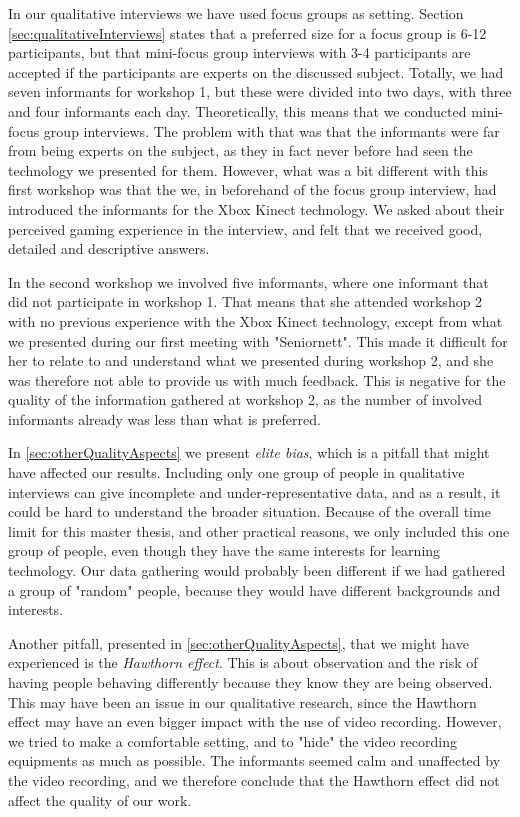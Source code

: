 In our qualitative interviews we have used focus groups as setting. Section \ref{sec:qualitativeInterviews} states that a preferred size for a focus group is 6-12 participants, but that mini-focus group interviews with 3-4 participants are accepted if the participants are experts on the discussed subject. Totally, we had seven informants for workshop 1, but these were divided into two days, with three and four informants each day. Theoretically, this means that we conducted mini-focus group interviews. The problem with that was that the informants were far from being experts on the subject, as they in fact never before had seen the technology we presented for them. However, what was a bit different with this first workshop was that the we, in beforehand of the focus group interview, had introduced the informants for the Xbox Kinect technology. We asked about their perceived gaming experience in the interview, and felt that we received good, detailed and descriptive answers. 

In the second workshop we involved five informants, where one informant that did not participate in workshop 1. That means that she attended workshop 2 with no previous experience with the Xbox Kinect technology, except from what we presented during our first meeting with "Seniornett". This made it difficult for her to relate to and understand what we presented during workshop 2, and she was therefore not able to provide us with much feedback. This is negative for the quality of the information gathered at workshop 2, as the number of involved informants already was less than what is preferred. 

In \ref{sec:otherQualityAspects} we present \emph{elite bias}, which is a pitfall that might have affected our results. Including only one group of people in qualitative interviews can give incomplete and under-representative data, and as a result, it could be hard to understand the broader situation. Because of the overall time limit for this master thesis, and other practical reasons, we only included this one group of people, even though they have the same interests for learning technology. Our data gathering would probably been different if we had gathered a group of "random" people, because they would have different backgrounds and interests.

Another pitfall, presented in \ref{sec:otherQualityAspects}, that we might have experienced  is the \emph{Hawthorn effect}. This is about observation and the risk of having people behaving differently because they know they are being observed. This may have been an issue in our qualitative research, since the Hawthorn effect may have an even bigger impact with the use of video recording. However, we tried to make a comfortable setting, and to "hide" the video recording equipments as much as possible. The informants seemed calm and unaffected by the video recording, and we therefore conclude that the Hawthorn effect did not affect the quality of our work. 

